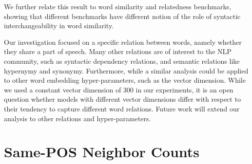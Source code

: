 \documentclass[11pt,a4paper]{article}
\begin{document}
    We further relate this result to word similarity and relatedness benchmarks,
    showing that different benchmarks have different notion of the role of
    syntactic interchangeability in word similarity.
    
    Our investigation focused on a specific relation between words,
    namely whether they share a part of speech.
    Many other relations are of interest to the NLP
    community, such as syntactic dependency relations,
    and semantic relations like hypernymy and synonymy.
    Furthermore, while a similar analysis could be applied to other word
    embedding hyper-parameters, such as the vector dimension.
    While we used a constant vector dimension of 300 in our experiments,
    it is an open question whether models with different vector dimensions
    differ with respect to their tendency to capture different word relations.
    Future work will extend our analysis to other relations and hyper-parameters.

    
    
    
\appendix
\section{Same-POS Neighbor Counts}\label{appendix:pos_hist}
    
\end{document}
